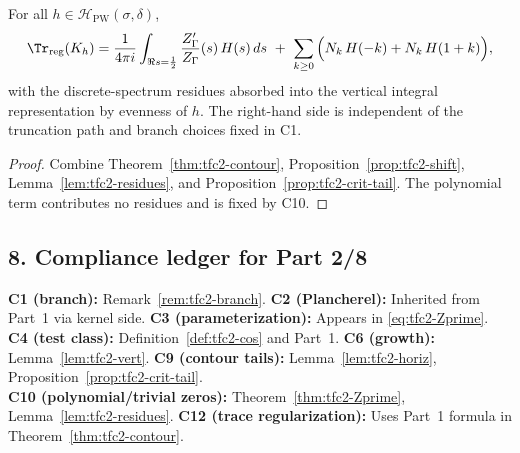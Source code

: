 \begin{theorem}\relax\hspace{0pt}
\label{thm:tfc2-E2E3} %
For all $h\in\mathcal{H}_{\mathrm{PW}}(\sigma,\delta)$,
\[
\Tr_{\mathrm{reg}}(K_h)=\frac{1}{4\pi i}\int_{\Re s=\frac12}\frac{Z'_\Gamma}{Z_\Gamma}(s)\,H(s)\,ds\ +\ \sum_{k\ge0}\Big(N_k\,H(-k)+N_k\,H(1+k)\Big),
\]
with the discrete-spectrum residues absorbed into the vertical integral representation by evenness of $h$. The right-hand side is independent of the truncation path and branch choices fixed in C1.\relax\hspace{0pt}
\end{theorem}

\begin{proof}\relax\hspace{0pt}
Combine Theorem~\ref{thm:tfc2-contour}, Proposition~\ref{prop:tfc2-shift}, Lemma~\ref{lem:tfc2-residues}, and Proposition~\ref{prop:tfc2-crit-tail}. The polynomial term contributes no residues and is fixed by C10.\relax\hspace{0pt}
\end{proof}

\subsection*{8. Compliance ledger for Part 2/8}\relax\hspace{0pt}
\label{subsec:tfc2-compliance} %

\noindent
\textbf{C1 (branch):} Remark~\ref{rem:tfc2-branch}. \quad
\textbf{C2 (Plancherel):} Inherited from Part~1 via kernel side. \quad
\textbf{C3 (parameterization):} Appears in \eqref{eq:tfc2-Zprime}. \\
\textbf{C4 (test class):} Definition~\ref{def:tfc2-cos} and Part~1. \quad
\textbf{C6 (growth):} Lemma~\ref{lem:tfc2-vert}. \quad
\textbf{C9 (contour tails):} Lemma~\ref{lem:tfc2-horiz}, Proposition~\ref{prop:tfc2-crit-tail}. \\
\textbf{C10 (polynomial/trivial zeros):} Theorem~\ref{thm:tfc2-Zprime}, Lemma~\ref{lem:tfc2-residues}. \quad
\textbf{C12 (trace regularization):} Uses Part~1 formula in Theorem~\ref{thm:tfc2-contour}.\relax\hspace{0pt}

